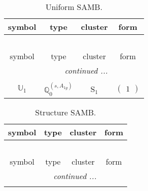 \documentclass[fleqn,10pt,landscape]{article}
\begin{document}
\begin{itemize}
\begin{center}
\begin{longtable}{c|c|c|c}
\end{longtable}
\end{center}
\begin{center}
\renewcommand{\arraystretch}{1.3}
\begin{longtable}{c|c|c|c}
\caption{Uniform SAMB.}
 \\
 \hline \hline
symbol & type & cluster & form \\ \hline \endfirsthead

\multicolumn{3}{l}{\tablename\ \thetable{}} \\
 \hline \hline
symbol & type & cluster & form \\ \hline \endhead

 \hline \hline
\multicolumn{3}{r}{\footnotesize\it continued ...} \\ \endfoot

 \hline \hline
\multicolumn{3}{r}{} \\ \endlastfoot

$ \mathbb{U}_{1} $ & $\mathbb{Q}_{0}^{(s,A_{1g})}$ & S$_{1}$ & $\begin{pmatrix} 1 \end{pmatrix}$ \\
\end{longtable}
\end{center}
\begin{center}
\renewcommand{\arraystretch}{1.3}
\begin{longtable}{c|c|c|c}
\caption{Structure SAMB.}
 \\
 \hline \hline
symbol & type & cluster & form \\ \hline \endfirsthead

\multicolumn{3}{l}{\tablename\ \thetable{}} \\
 \hline \hline
symbol & type & cluster & form \\ \hline \endhead

 \hline \hline
\multicolumn{3}{r}{\footnotesize\it continued ...} \\ \endfoot


\end{longtable}
\end{center}
\end{itemize}
\end{document}
